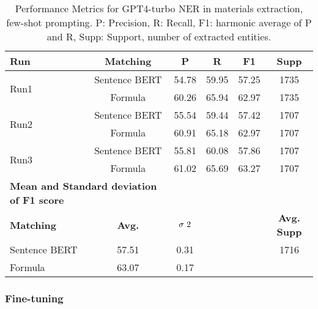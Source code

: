 \begin{table}[htbp]
\small
  \centering
  \caption{Performance Metrics for GPT4-turbo NER in materials extraction, few-shot prompting. P: Precision, R: Recall, F1: harmonic average of P and R, Supp: Support, number of extracted entities.}
  \begin{tabular}{lccccc}
    \toprule
    \textbf{Run} & \textbf{Matching} & \textbf{P} & \textbf{R} & \textbf{F1} & \textbf{Supp} \\
    \midrule
    \multirow{2}{*}{Run1} & Sentence BERT & 54.78 & 59.95 & 57.25 & 1735 \\
    & Formula & 60.26 & 65.94 & 62.97 & 1735 \\
    \midrule
    \multirow{2}{*}{Run2} & Sentence BERT & 55.54 & 59.44 & 57.42 & 1707 \\
    & Formula & 60.91 & 65.18 & 62.97 & 1707 \\
    \midrule
    \multirow{2}{*}{Run3} & Sentence BERT & 55.81 & 60.08 & 57.86 & 1707 \\
    & Formula & 61.02 & 65.69 & 63.27 & 1707 \\
    \midrule
    \multicolumn{2}{l}{\textbf{Mean and Standard deviation of F1 score}} & & & & \\
    \midrule
    \textbf{Matching} & \textbf{Avg.} & $\sigma\textsuperscript{2}$ & & & \textbf{Avg. Supp}\\
    Sentence BERT & 57.51 & 0.31 & & & 1716 \\
    Formula & 63.07 & 0.17 & & & \\
    \bottomrule
  \end{tabular}
\end{table}

\clearpage
\subsubsection{Fine-tuning}

